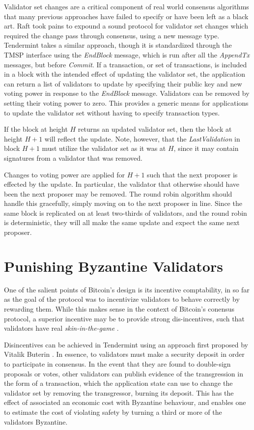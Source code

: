 Validator set changes are a critical component of real world consensus algorithms that many previous approaches have failed to specify 
or have been left as a black art. 
Raft took pains to expound a sound protocol for validator set changes which required the change pass through consensus, 
using a new message type.
Tendermint takes a similar approach, though it is standardized through the TMSP interface using the \emph{EndBlock} message,
which is run after all the \emph{AppendTx} messages, but before \emph{Commit}.
If a transaction, or set of transactions, is included in a block with the intended effect of updating the validator set,
the application can return a list of validators to update by specifying their public key and new voting power 
in response to the \emph{EndBlock} message.
Validators can be removed by setting their voting power to zero.
This provides a generic means for applications to update the validator set without having to specify transaction types.

If the block at height $H$ returns an updated validator set, 
then the block at height $H+1$ will reflect the update.
Note, however, that the \emph{LastValidation} in block $H+1$
must utilize the validator set as it was at $H$, 
since it may contain signatures from a validator that was removed.

Changes to voting power are applied for $H+1$ such that the next proposer 
is effected by the update. 
In particular, the validator that otherwise should have been the next proposer may be removed.
The round robin algorithm should handle this gracefully, simply moving on to the next proposer in line.
Since the same block is replicated on at least two-thirds of validators, 
and the round robin is deterministic,
they will all make the same update and expect the same next proposer.

\section{Punishing Byzantine Validators}

One of the salient points of Bitcoin's design is its incentive comptability, 
in so far as the goal of the protocol was to incentivize validators to behave correctly
by rewarding them. While this makes sense in the context of Bitcoin's conensus protocol,
a superior incentive may be to provide strong dis-incentives, such that validators
have real \emph{skin-in-the-game} \cite{taleb2014skin}.

Disincentives can be achieved in Tendermint using an approach first proposed by Vitalik Buterin \cite{slasher}.
In essence, to validators must make a security deposit in order to participate in consensus.
In the event that they are found to double-sign proposals or votes, 
other validators can publish evidence of the transgression in the form of a transaction, 
which the application state can use to change the validator set by removing the transgressor, burning its deposit.
This has the effect of associated an economic cost with Byzantine behaviour, 
and enables one to estimate the cost of violating safety by turning a third or more of the validators Byzantine.

